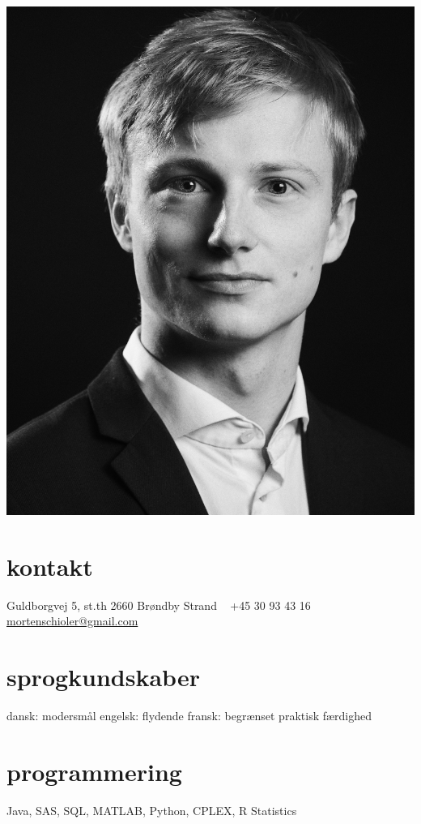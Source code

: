 \documentclass[]{friggeri-cv} %
\begin{document}


\begin{aside} %
\includegraphics[width=\linewidth]{./graphics/pic8x10.jpg}
\section{kontakt}
Guldborgvej 5, st.th
2660 Brøndby Strand
~
+45 30 93 43 16
{\small \href{mailto:mortenschioler@gmail.com}{mortenschioler@gmail.com}}
\section{sprogkundskaber}
	dansk:  \quad modersmål
	engelsk: \quad flydende
	fransk: \quad begrænset praktisk færdighed
\section{programmering}
Java, SAS, SQL,
\textsc{MATLAB}, Python, CPLEX,
R Statistics
\end{aside}
\end{document}
